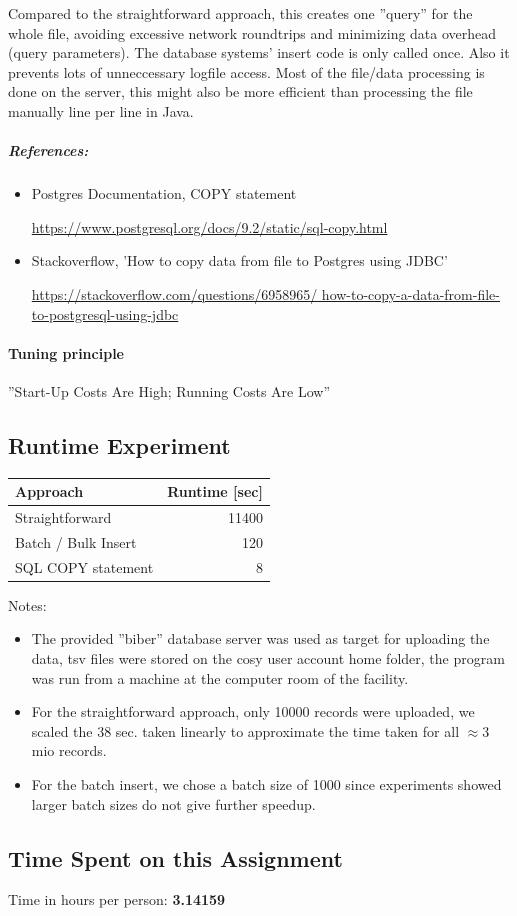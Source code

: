 \documentclass[11pt]{scrartcl}
\begin{document}
  Compared to the straightforward approach, this creates one ''query''
  for the whole file, avoiding excessive network roundtrips and minimizing
  data overhead (query parameters). The database systems' insert code
  is only called once. Also it prevents lots of unneccessary
  logfile access. Most of the file/data processing
  is done on the server, this might also be more efficient than
  processing the file manually line per line in Java.
  
  
  \subparagraph{References:}
  
  \begin{itemize}
  
  \item{Postgres Documentation, COPY statement}
  
  \url{https://www.postgresql.org/docs/9.2/static/sql-copy.html}
  
  \item{Stackoverflow, 'How to copy data from file to Postgres using JDBC'}
  
  \url{https://stackoverflow.com/questions/6958965/
  how-to-copy-a-data-from-file-to-postgresql-using-jdbc}
  
  \end{itemize}

  \paragraph{Tuning principle}
  
  ''Start-Up Costs Are High; Running Costs Are Low''

  \subsection*{Runtime Experiment}

  \begin{table}[H]
  \begin{tabular}{l|r}
    Approach & Runtime [sec] \\
    \hline
    Straightforward & 11400 \\
    Batch / Bulk Insert & 120 \\
    SQL COPY statement & 8   
  \end{tabular}
  \end{table}

  \bigskip

  \noindent Notes:
  \begin{itemize}
  \item The provided ''biber'' database server was used as target for
  uploading the data, tsv files were stored on the cosy user account home folder,
  the program was run from a machine at the computer room of the facility.
  
  \item For the straightforward approach, only 10000 records were uploaded,
  we scaled the 38 sec. taken linearly to approximate the time taken for all $\approx 3$ mio records.
  
  \item For the batch insert, we chose a batch size of 1000 since experiments showed
  larger batch sizes do not give further speedup.
\end{itemize}

  \subsection*{Time Spent on this Assignment}

  Time in hours per person: {\bf 3.14159}
\end{document}
